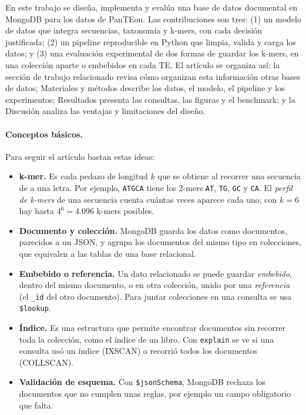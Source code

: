 \documentclass[unnumsec,namedate,webpdf,contemporary,large]{oup-authoring-template}
\begin{document}
En este trabajo se dise\~na, implementa y eval\'ua una base de datos documental en MongoDB \citep{mongodb7} para los datos de PanTEon. Las contribuciones son tres: (1) un modelo de datos que integra secuencias, taxonom\'ia y k-mers, con cada decisi\'on justificada; (2) un pipeline reproducible en Python que limpia, valida y carga los datos; y (3) una evaluaci\'on experimental de dos formas de guardar los k-mers, en una colecci\'on aparte o embebidos en cada TE. El art\'iculo se organiza as\'i: la secci\'on de trabajo relacionado revisa c\'omo organizan esta informaci\'on otras bases de datos; Materiales y m\'etodos describe los datos, el modelo, el pipeline y los experimentos; Resultados presenta las consultas, las figuras y el benchmark; y la Discusi\'on analiza las ventajas y limitaciones del dise\~no.

\paragraph{Conceptos b\'asicos.} Para seguir el art\'iculo bastan estas ideas:
\begin{itemize}
\item \textbf{k-mer.} Es cada pedazo de longitud $k$ que se obtiene al recorrer una secuencia de a una letra. Por ejemplo, \texttt{ATGCA} tiene los 2-mers \texttt{AT}, \texttt{TG}, \texttt{GC} y \texttt{CA}. El \emph{perfil de k-mers} de una secuencia cuenta cu\'antas veces aparece cada uno; con $k = 6$ hay hasta $4^6 = 4.096$ k-mers posibles.
\item \textbf{Documento y colecci\'on.} MongoDB guarda los datos como documentos, parecidos a un JSON, y agrupa los documentos del mismo tipo en colecciones, que equivalen a las tablas de una base relacional.
\item \textbf{Embebido o referencia.} Un dato relacionado se puede guardar \emph{embebido}, dentro del mismo documento, o en otra colecci\'on, unido por una \emph{referencia} (el \texttt{\_id} del otro documento). Para juntar colecciones en una consulta se usa \texttt{\$lookup}.
\item \textbf{\'Indice.} Es una estructura que permite encontrar documentos sin recorrer toda la colecci\'on, como el \'indice de un libro. Con \texttt{explain} se ve si una consulta us\'o un \'indice (IXSCAN) o recorri\'o todos los documentos (COLLSCAN).
\item \textbf{Validaci\'on de esquema.} Con \texttt{\$jsonSchema}, MongoDB rechaza los documentos que no cumplen unas reglas, por ejemplo un campo obligatorio que falta.
\end{itemize}
\end{document}
